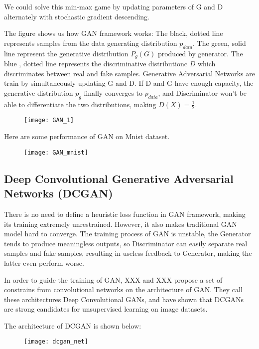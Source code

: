 We could solve this min-max game by updating parameters of G and D alternately with stochastic gradient descending.

The figure shows us how GAN framework works: The black, dotted line represents samples from the data generating distribution $p_{data}$. The green, solid line represent the generative distribution $P_g(G)$ produced by generator. The blue , dotted line represents the discriminative distributionc $D$ which discriminates between real and fake samples. Generative Adversarial Networks are train by simultaneously updating G and D. If D and G have enough capacity, the generative distribution $p_g$ finally converges to $p_{data}$, and Discriminator won't be able to differentiate the two distributions, making $D(X)=\frac{1}{2}$.
\begin{figure}
	\centering
	\texttt{[image: GAN\_1]}
	\label{fig:7}
\end{figure}

Here are some performance of GAN on Mnist dataset.
\begin{figure}
	\centering
	\texttt{[image: GAN\_mnist]}
	\label{fig:8}
\end{figure}
\subsection{Deep Convolutional Generative Adversarial Networks (DCGAN)}
There is no need to define a heuristic loss function in GAN framework, making its training extremely unrestrained. However, it also makes traditional GAN model hard to converge. The training process of GAN is unstable, the Generator tends to produce meaningless outputs, so Discriminator can easily separate real samples and fake samples, resulting in useless feedback to Generator, making the latter even perform worse.

In order to guide the training of GAN, XXX and XXX propose a set of constrains from convolutional networks on the architecture of GAN. They call these architectures Deep Convolutional GANs, and have shown that DCGANs are strong candidates for unsupervised learning on image datasets.

The architecture of DCGAN is shown below: 
\begin{figure}
	\centering
	\texttt{[image: dcgan\_net]}
	\label{fig:9}
\end{figure}

